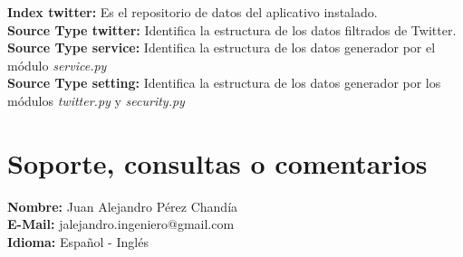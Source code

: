 \documentclass[report]{article}
\begin{document}
\textbf{Index twitter: }Es el repositorio de datos del aplicativo instalado.\\
\textbf{Source Type twitter: }Identifica la estructura de los datos filtrados de Twitter.\\
\textbf{Source Type service: }Identifica la estructura de los datos generador por el m\'odulo \textit{service.py}\\
\textbf{Source Type setting: }Identifica la estructura de los datos generador por los m\'odulos \textit{twitter.py} y \textit{security.py}
\newline
\section{Soporte, consultas o comentarios}

\textbf{Nombre: }Juan Alejandro P\'erez Chand\'ia\\
\textbf{E-Mail: }jalejandro.ingeniero@gmail.com\\
\textbf{Idioma: }Espa\~nol - Ingl\'es
\end{document}
